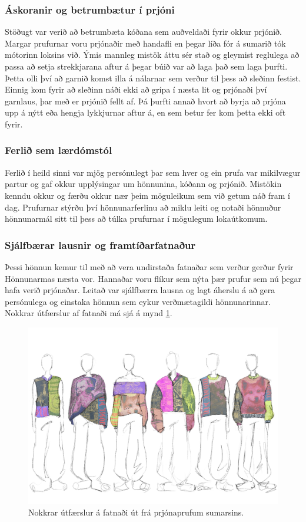 \documentclass[a4paper,12pt,twoside]{article}
\begin{document}
\subsubsection{Áskoranir og betrumbætur í prjóni}
Stöðugt var verið að betrumbæta kóðana sem auðveldaði fyrir okkur prjónið. Margar prufurnar voru prjónaðir með handafli en þegar líða fór á sumarið tók mótorinn loksins við. Ýmis mannleg mistök áttu sér stað og gleymist reglulega að passa að setja strekkjarana aftur á þegar búið var að laga það sem laga þurfti. Þetta olli því að garnið komst illa á nálarnar sem verður til þess að sleðinn festist. Einnig kom fyrir að sleðinn náði ekki að grípa í næsta lit og prjónaði því garnlaus, þar með er prjónið fellt af. Þá þurfti annað hvort að byrja að prjóna upp á nýtt eða hengja lykkjurnar aftur á, en sem betur fer kom þetta ekki oft fyrir. 
\subsubsection{Ferlið sem lærdómstól}
Ferlið í heild sinni var mjög persónulegt þar sem hver og ein prufa var mikilvægur partur og gaf okkur upplýsingar um hönnunina, kóðann og prjónið. Mistökin kenndu okkur og færðu okkur nær þeim möguleikum sem við getum náð fram í dag. Prufurnar stýrðu því hönnunarferlinu að miklu leiti og notaði hönnuður hönnunarmál sitt til þess að túlka prufurnar í mögulegum lokaútkomum. 
\subsubsection{Sjálfbærar lausnir og framtíðarfatnaður}
Þessi hönnun kemur til með að vera undirstaða fatnaðar sem verður gerður fyrir Hönnunarmas næsta vor. Hannaðar voru flíkur sem nýta þær prufur sem nú þegar hafa verið prjónaðar. Leitað var sjálfbærra lausna og lagt áherslu á að gera persónulega og einstaka hönnun sem eykur verðmætagildi hönnunarinnar. Nokkrar útfærslur af fatnaði má sjá á mynd \ref{fig:designproposal}.

\begin{figure}
    \centering
    \includegraphics[width=\linewidth]{myndir/gisa/collection.JPG}
    \caption{Nokkrar útfærslur á fatnaði út frá prjónaprufum sumarsins.}
    \label{fig:designproposal}
\end{figure}
\end{document}
